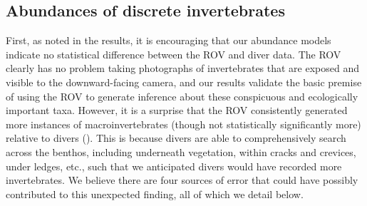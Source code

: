 \documentclass[11pt]{article}
\begin{document}
\subsection{Abundances of discrete invertebrates}

First, as noted in the results, it is encouraging that our abundance models 
indicate no statistical difference between the ROV and diver data. 
The ROV clearly has no problem taking photographs of invertebrates that are 
exposed and visible to the downward-facing camera, and our results validate the 
basic premise of using the ROV to generate inference about these conspicuous 
and ecologically important taxa. 
However, it is a surprise that the ROV consistently generated more instances of
macroinvertebrates (though not statistically significantly more) relative to
divers ().
This is because divers are able to comprehensively search across the benthos, 
including underneath vegetation, within cracks and crevices, under ledges, 
etc., such that we anticipated divers would have recorded more invertebrates. 
We believe there are four sources of error that could have possibly contributed 
to this unexpected finding, all of which we detail below. 
\end{document}
